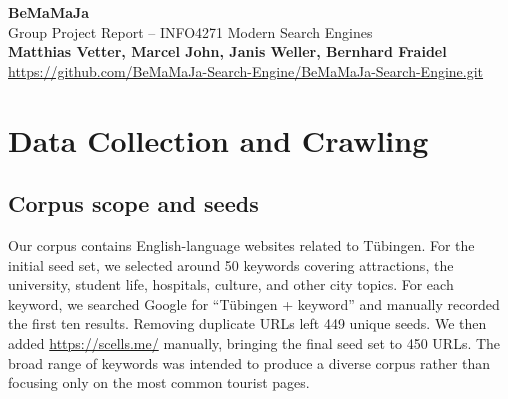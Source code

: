 \documentclass[10pt,a4paper]{article}
\begin{document}
\begin{center}
  {\Large\bfseries BeMaMaJa}\\[3pt]
  {\normalsize Group Project Report -- INFO4271 Modern Search Engines}\\[7pt]
  \textbf{Matthias Vetter, Marcel John, Janis Weller, Bernhard Fraidel}\\[2pt]
  \url{https://github.com/BeMaMaJa-Search-Engine/BeMaMaJa-Search-Engine.git}
\end{center}

\begin{abstract}
  This project presents a search engine built from scratch for English-language web pages related to T\"ubingen. It starts with a web crawler that uses a given seed set to retrieve web pages.
To avoid crawling undesirable websites, a blacklist is used, and the crawler respects the robots.txt protocol. To improve performance, the crawler uses multiple worker threads.
For indexing, the retrieved pages are tokenized, stopwords are removed, and the remaining words are stemmed before constructing the inverted index.
The retrieval stage is based on the BM25 algorithm with an integrated spelling correction mechanism. For re-ranking,
we combine the BM25 score with field boosts, link counts, PRF, location-aware ranking signals, and soft domain diversification.
The frontend provides a modern interface with controllable AI-generated page summaries,
explainable ranking signals and direct batch-file upload.
\end{abstract}

\section{Data Collection and Crawling}
  \subsection{Corpus scope and seeds}
  Our corpus contains English-language websites related to Tübingen. For the initial seed
  set, we selected around 50 keywords covering attractions, the university, student life,
  hospitals, culture, and other city topics. For each keyword, we searched Google for
  ``Tübingen + keyword'' and manually recorded the first ten results. Removing duplicate
  URLs left 449 unique seeds. We then added \href{https://scells.me/}{https://scells.me/}
  manually, bringing the final seed set to 450 URLs. The broad range of keywords was intended
  to produce a diverse corpus rather than focusing only on the most common tourist pages.
\end{document}
